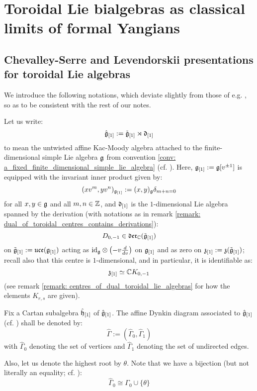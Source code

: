 \section{Toroidal Lie bialgebras as classical limits of formal Yangians}
    \subsection{Chevalley-Serre and Levendorskii presentations for toroidal Lie algebras}
        \begin{convention} \label{conv: a_fixed_untwisted_affine_kac_moody_algebra}
            We introduce the following notations, which deviate slightly from those of e.g. \cite[Chapter 7]{kac_infinite_dimensional_lie_algebras}, so as to be consistent with the rest of our notes.
        
            Let us write:
                $$\hat{\mathfrak{g}}_{[1]} := \tilde{\mathfrak{g}}_{[1]} \rtimes \mathfrak{d}_{[1]}$$
            to mean the untwisted affine Kac-Moody algebra attached to the finite-dimensional simple Lie algebra $\mathfrak{g}$ from convention \ref{conv: a_fixed_finite_dimensional_simple_lie_algebra} (cf. \cite[Chapter 7]{kac_infinite_dimensional_lie_algebras}). Here, $\mathfrak{g}_{[1]} := \mathfrak{g}[v^{\pm 1}]$ is equipped with the invariant inner product given by:
                $$(x v^m, y v^n)_{\mathfrak{g}_{[1]}} := (x, y)_{\mathfrak{g}} \delta_{m + n = 0}$$
            for all $x, y \in \mathfrak{g}$ and all $m, n \in \mathbb{Z}$, and $\mathfrak{d}_{[1]}$ is the $1$-dimensional Lie algebra spanned by the derivation (with notations as in remark \ref{remark: dual_of_toroidal_centres_contains_derivations}):
                $$D_{0, -1} \in \mathfrak{der}_{\mathbb{C}}(\tilde{\mathfrak{g}}_{[1]})$$
            on $\tilde{\mathfrak{g}}_{[1]} := \mathfrak{uce}(\mathfrak{g}_{[1]})$ acting as $\id_{\g} \tensor \left( -v \frac{d}{dv} \right)$ on $\mathfrak{g}_{[1]}$ and as zero on $\mathfrak{z}_{[1]} := \mathfrak{z}(\tilde{\mathfrak{g}}_{[1]})$; recall also that this centre is $1$-dimensional, and in particular, it is identifiable as:
                $$\mathfrak{z}_{[1]} \simeq \mathbb{C} K_{0, -1}$$
            (see remark \ref{remark: centres_of_dual_toroidal_lie_algebras} for how the elements $K_{r, s}$ are given).

            Fix a Cartan subalgebra $\hat{\mathfrak{h}}_{[1]}$ of $\hat{\mathfrak{g}}_{[1]}$. The affine Dynkin diagram associated to $\hat{\mathfrak{g}}_{[1]}$ (cf. \cite[Chapter 4]{kac_infinite_dimensional_lie_algebras}) shall be denoted by:
                $$\hat{\Gamma} := ( \hat{\Gamma}_0, \hat{\Gamma}_1 )$$
            with $\hat{\Gamma}_0$ denoting the set of vertices and $\hat{\Gamma}_1$ denoting the set of undirected edges.

            Also, let us denote the highest root by $\theta$. Note that we have a bijection (but not literally an equality; cf. \cite[Chapters 4, 5, 7]{kac_infinite_dimensional_lie_algebras}):
                $$\hat{\Gamma}_0 \cong \Gamma_0 \cup \{\theta\}$$
        \end{convention}
    
